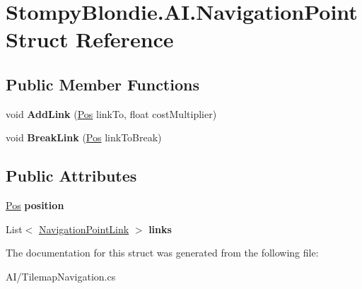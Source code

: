 \hypertarget{struct_stompy_blondie_1_1_a_i_1_1_navigation_point}{}\section{Stompy\+Blondie.\+A\+I.\+Navigation\+Point Struct Reference}
\label{struct_stompy_blondie_1_1_a_i_1_1_navigation_point}
\subsection*{Public Member Functions}
\begin{DoxyCompactItemize}
\item 
\mbox{\label{struct_stompy_blondie_1_1_a_i_1_1_navigation_point_abc0e08ae4c5adba28a1cdc2d8582498f}} 
void {\bfseries Add\+Link} (\mbox{\hyperlink{struct_stompy_blondie_1_1_common_1_1_types_1_1_pos}{Pos}} link\+To, float cost\+Multiplier)
\item 
\mbox{\label{struct_stompy_blondie_1_1_a_i_1_1_navigation_point_a64ecccc4561cfa8073b2afbd6fa1bacf}} 
void {\bfseries Break\+Link} (\mbox{\hyperlink{struct_stompy_blondie_1_1_common_1_1_types_1_1_pos}{Pos}} link\+To\+Break)
\end{DoxyCompactItemize}
\subsection*{Public Attributes}
\begin{DoxyCompactItemize}
\item 
\mbox{\label{struct_stompy_blondie_1_1_a_i_1_1_navigation_point_a7a6c1f4bdf3a03b0ce91841e757a55c6}} 
\mbox{\hyperlink{struct_stompy_blondie_1_1_common_1_1_types_1_1_pos}{Pos}} {\bfseries position}
\item 
\mbox{\label{struct_stompy_blondie_1_1_a_i_1_1_navigation_point_a66d3f456267553476dfc34c0ebf9f9e2}} 
List$<$ \mbox{\hyperlink{struct_stompy_blondie_1_1_a_i_1_1_navigation_point_link}{Navigation\+Point\+Link}} $>$ {\bfseries links}
\end{DoxyCompactItemize}


The documentation for this struct was generated from the following file\+:\begin{DoxyCompactItemize}
\item 
A\+I/Tilemap\+Navigation.\+cs\end{DoxyCompactItemize}

